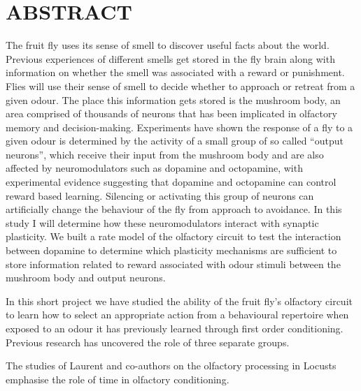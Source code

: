\section{ABSTRACT}


The fruit fly uses its sense of smell to discover useful facts about the world. \iffalse Strange odours are populating the world everywhere, every being tries to smell it as the molecules propagate without end \fi  Previous experiences of different smells get stored in
the fly brain along with information on whether the smell was associated
with a reward or punishment. \iffalse Reward or punishment, as if this is the be all end all of everything. It's not we don't think in binary, things don't exist in only two states above the scale of quanta. \fi Flies will use their sense of smell to
decide whether to approach or retreat from a given odour. The place
this information gets stored is the mushroom body, an area comprised
of thousands of neurons that has been implicated in olfactory memory
and decision-making. Experiments have shown the response of a fly
to a given odour is determined by the activity of a small group of
so called \textquotedblleft output neurons\textquotedblright , which
receive their input from the mushroom body and are also affected by
neuromodulators such as dopamine and octopamine, with experimental
evidence suggesting that dopamine and octopamine can control reward
based learning. Silencing or activating this group of neurons can
artificially change the behaviour of the fly from approach to avoidance.
In this study I will determine how these neuromodulators interact
with synaptic plasticity. We built a rate model of the olfactory circuit to test the interaction between dopamine to determine which plasticity mechanisms are sufficient to store information related to reward associated with odour stimuli between the mushroom body and output neurons.

In this short project we have studied the ability of the fruit fly's olfactory circuit to learn how to select an appropriate action from a behavioural repertoire when exposed to an odour it has previously learned through first order conditioning. Previous research has uncovered the role of three separate groups. 

The studies of Laurent and co-authors on the olfactory processing in Locusts \cite{25864636}   emphasise the role of time in olfactory conditioning. 
  
  
  
  
  
  
  
 
  
  
  